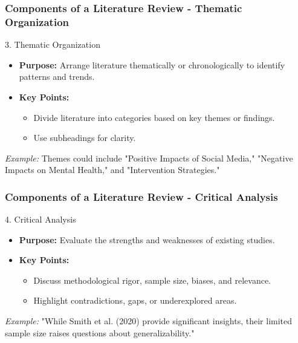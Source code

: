 \documentclass[aspectratio=169]{beamer}
\begin{document}
\begin{frame}[fragile]
    \frametitle{Components of a Literature Review - Thematic Organization}
    \begin{block}{3. Thematic Organization}
        \begin{itemize}
            \item \textbf{Purpose:} Arrange literature thematically or chronologically to identify patterns and trends.
            \item \textbf{Key Points:}
                \begin{itemize}
                    \item Divide literature into categories based on key themes or findings.
                    \item Use subheadings for clarity.
                \end{itemize}
        \end{itemize}
        \textit{Example:} Themes could include "Positive Impacts of Social Media," "Negative Impacts on Mental Health," and "Intervention Strategies."
    \end{block}
\end{frame}

\begin{frame}[fragile]
    \frametitle{Components of a Literature Review - Critical Analysis}
    \begin{block}{4. Critical Analysis}
        \begin{itemize}
            \item \textbf{Purpose:} Evaluate the strengths and weaknesses of existing studies.
            \item \textbf{Key Points:}
                \begin{itemize}
                    \item Discuss methodological rigor, sample size, biases, and relevance.
                    \item Highlight contradictions, gaps, or underexplored areas.
                \end{itemize}
        \end{itemize}
        \textit{Example:} "While Smith et al. (2020) provide significant insights, their limited sample size raises questions about generalizability."
    \end{block}
\end{frame}
\end{document}
